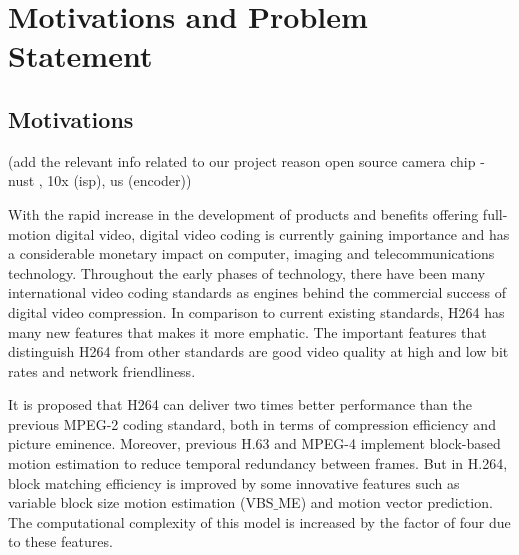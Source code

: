 
\chapter{Motivations and Problem Statement} %
\label{Chapter2}

\section{Motivations}

(add the relevant info related to our project reason open source camera chip - nust , 10x (isp), us (encoder))

With the rapid increase in the development of products and benefits offering full-motion digital video, digital video coding is currently gaining importance and has a considerable monetary impact on computer, imaging and telecommunications technology. Throughout the early phases of technology, there have been many international video coding standards as engines behind the commercial success of digital video compression. In comparison to current existing standards, H264 has many new features that makes it more emphatic. The important features that distinguish H264 from other standards are good video quality at high and low bit rates and network friendliness. 

It is proposed that H264 can deliver two times better performance than the previous MPEG-2 coding standard, both in terms of compression efficiency and picture eminence. Moreover, previous H.63 and MPEG-4 implement block-based motion estimation to reduce temporal redundancy between frames. But in H.264, block matching efficiency is improved by some innovative features such as variable block size motion estimation (VBS$\_$ME) and motion vector prediction. The computational complexity of this model is increased by the factor of four due to these features.







